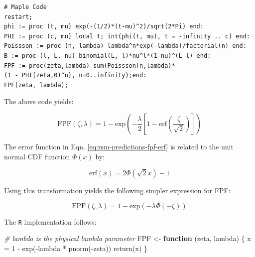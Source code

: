 \documentclass[
]{book}
\newenvironment{Shaded}{\begin{snugshade}}{\end{snugshade}}
\newcommand{\CommentTok}[1]{\textcolor[rgb]{0.56,0.35,0.01}{\textit{#1}}}
\newcommand{\ControlFlowTok}[1]{\textcolor[rgb]{0.13,0.29,0.53}{\textbf{#1}}}
\newcommand{\DecValTok}[1]{\textcolor[rgb]{0.00,0.00,0.81}{#1}}
\newcommand{\FunctionTok}[1]{\textcolor[rgb]{0.00,0.00,0.00}{#1}}
\newcommand{\NormalTok}[1]{#1}
\newcommand{\OtherTok}[1]{\textcolor[rgb]{0.56,0.35,0.01}{#1}}
\newcommand{\SpecialCharTok}[1]{\textcolor[rgb]{0.00,0.00,0.00}{#1}}
\begin{document}
\begin{verbatim}
# Maple Code
restart;
phi := proc (t, mu) exp(-(1/2)*(t-mu)^2)/sqrt(2*Pi) end: 
PHI := proc (c, mu) local t; int(phi(t, mu), t = -infinity .. c) end: 
Poissson := proc (n, lambda) lambda^n*exp(-lambda)/factorial(n) end: 
B := proc (l, L, nu) binomial(L, l)*nu^l*(1-nu)^(L-l) end:
FPF := proc(zeta,lambda) sum(Poissson(n,lambda)*
(1 - PHI(zeta,0)^n), n=0..infinity);end:
FPF(zeta, lambda);   
\end{verbatim}

The above code yields:

\begin{equation}
\text{FPF}\left (\zeta , \lambda\right ) = 1 - \text{exp}\left ( -\frac{\lambda}{2} \left [ 1-\text{erf}\left ( \frac{\zeta}{\sqrt{2}} \right ) \right ]  \right ) 
\label{eq:rsm-predictions-fpf-erf}
\end{equation}

The error function in Eqn. \eqref{eq:rsm-predictions-fpf-erf} is related to the unit normal CDF function \(\Phi(x)\) by:

\begin{equation}
\text{erf} \left (x \right ) =  2\Phi \left ( \sqrt{2} x\right ) - 1
\label{eq:rsm-predictions-erf-phi-relation}
\end{equation}

Using this transformation yields the following simpler expression for FPF:

\begin{equation}
\text{FPF}\left (\zeta , \lambda\right ) = 1 - \text{exp}\left ( -\lambda \Phi\left ( -\zeta \right )  \right )
\label{eq:rsm-predictions-fpf}
\end{equation}

The \texttt{R} implementation follows:

\begin{Shaded}
\begin{Highlighting}[]
\CommentTok{\# lambda is the physical lambda\textquotesingle{} parameter}
\NormalTok{FPF }\OtherTok{\textless{}{-}} \ControlFlowTok{function}\NormalTok{ (zeta, lambda) \{}
\NormalTok{  x }\OtherTok{=} \DecValTok{1} \SpecialCharTok{{-}} \FunctionTok{exp}\NormalTok{(}\SpecialCharTok{{-}}\NormalTok{lambda }\SpecialCharTok{*} \FunctionTok{pnorm}\NormalTok{(}\SpecialCharTok{{-}}\NormalTok{zeta))}
  \FunctionTok{return}\NormalTok{(x)}
\NormalTok{\}}
\end{Highlighting}
\end{Shaded}
\end{document}

